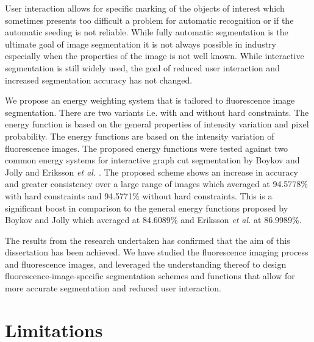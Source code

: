 \begin{definition}
	User interaction allows for specific marking of the objects of interest which sometimes presents too difficult a problem for automatic recognition or if the automatic seeding is not reliable. While fully automatic segmentation is the ultimate goal of image segmentation it is not always possible in industry especially when the properties of the image is not well known. While interactive segmentation is still widely used, the goal of reduced user interaction and increased segmentation accuracy has not changed.
	
	We propose an energy weighting system that is tailored to fluorescence image segmentation. There are two variants i.e. with and without hard constraints. The energy function is based on the general properties of intensity variation and pixel probability. The energy functions are based on the intensity variation of fluorescence images.
	The proposed energy functions were tested against two common energy systems for interactive graph cut segmentation by Boykov and Jolly \citep{Boykov2001_2} and Eriksson \textit{et al.} \citep{Eriksson2006}.
	The proposed scheme shows an increase in accuracy and greater consistency over a large range of images which averaged at 94.5778\% with hard constraints and 94.5771\% without hard constraints. This is a significant boost in comparison to the general energy functions proposed by Boykov and Jolly \citep{Boykov2001_2} which averaged at 84.6089\% and Eriksson \textit{et al.} \citep{Eriksson2006} at 86.9989\%.
\end{definition}

The results from the research undertaken has confirmed that the aim of this dissertation has been achieved. We have studied the fluorescence imaging process and fluorescence images, and leveraged the understanding thereof to design fluorescence-image-specific segmentation schemes and functions that allow for more accurate segmentation and reduced user interaction.

\section{Limitations}

